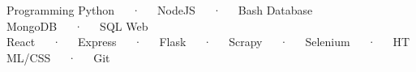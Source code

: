 

\begin{cvtechnicals}
  \cvtechnical %
    {Programming} %
    {Python~~~·~~~NodeJS~~~·~~~Bash} %
    {Database} %
    {MongoDB~~~·~~~SQL} %
    {Web} %
    {React~~~·~~~Express~~~·~~~Flask~~~·~~~Scrapy~~~·~~~Selenium~~~·~~~HTML/CSS~~~·~~~Git} %
\end{cvtechnicals}